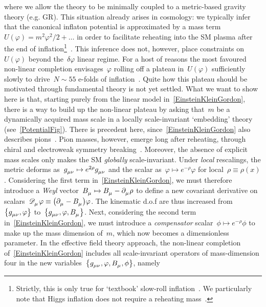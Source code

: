 \documentclass[aps,prd,reprint,preprintnumbers,showpacs,floatfix,nofootinbib,superscript address]{revtex4-2}
\begin{document}
where we allow the theory to be minimally coupled to a metric-based gravity theory (e.g. GR). This situation already arises in cosmology: we typically infer that the canonical inflaton potential is approximated by a mass term~$U(\varphi)=m^2\varphi^2/2+\dots$ in order to facilitate reheating into the SM plasma after the end of inflation\footnote{Strictly, this is only true for `textbook' slow-roll inflation~\cite{Hobson:2006se,Vazquez:2018qdg,Achucarro:2022qrl}. We particularly note that Higgs inflation does not require a reheating mass~\cite{Bezrukov:2007ep}.}~\cite{Allahverdi:2010xz}. This inference does not, however, place constraints on~$U(\varphi)$ beyond the~$\delta\varphi$ linear regime. For a host of reasons the most favoured non-linear completion envisages~$\varphi$ rolling off a plateau in~$U(\varphi)$ sufficiently slowly to drive~$N\sim 55$ e-folds of inflation~\cite{Planck:2013jfk,Planck:2015sxf,Planck:2018jri}. Quite how this plateau should be motivated through fundamental theory is not yet settled. What we want to show here is that, starting purely from the linear model in~\cref{EinsteinKleinGordon}, there is a way to build up the non-linear plateau by asking that~$m$ be a dynamically acquired mass scale in a locally scale-invariant `embedding' theory (see~\cref{PotentialFig}). There is precedent here, since~\cref{EinsteinKleinGordon} also describes pions~\cite{Georgi:1984zwz,Donoghue:1992dd,Manohar:2000dt,Scherer:2012xha}. Pion masses, however, emerge long after reheating, through chiral and electroweak symmetry breaking~\cite{Higgs:1964pj,Guralnik:1964eu}. Moreover, the absence of explicit mass scales only makes the SM \emph{globally} scale-invariant. Under \emph{local} rescalings, the metric deforms as~$\FieldG{_{\mu\nu}}\mapsto e^{2\rho}\FieldG{_{\mu\nu}}$ and the scalar as~$\varphi\mapsto e^{-\rho}\varphi$ for local~$\rho\equiv\rho(x)$. Considering the first term in~\cref{EinsteinKleinGordon}, we must therefore introduce a \emph{Weyl} vector~$\FieldV{_\mu}\mapsto\FieldV{_\mu}-\PD{_\mu}\rho$ to define a new covariant derivative on scalars~$\SCovD{_\mu}\varphi\equiv\big(\PD{_\mu}-\FieldV{_\mu}\big)\varphi$. The kinematic d.o.f are thus increased from~$\big\{\FieldG{_{\mu\nu}},\varphi\big\}$ to~$\big\{\FieldG{_{\mu\nu}},\varphi,\FieldV{_\mu}\big\}$. Next, considering the second term in~\cref{EinsteinKleinGordon}, we must introduce a \emph{compensator} scalar~$\phi\mapsto e^{-\rho}\phi$ to make up the mass dimension of~$m$, which now becomes a dimensionless parameter. In the effective field theory approach, the non-linear completion of~\cref{EinsteinKleinGordon} includes all scale-invariant operators of mass-dimension four in the new variables~$\big\{\FieldG{_{\mu\nu}},\varphi,\FieldV{_\mu},\phi\big\}$, namely
\end{document}
